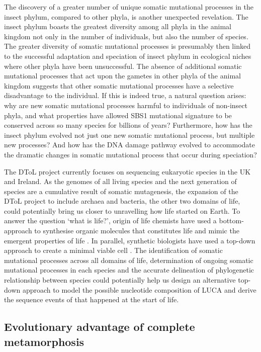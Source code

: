 The discovery of a greater number of unique somatic mutational processes in the insect phylum, compared to other phyla, is another unexpected revelation. The insect phylum boasts the greatest diversity among all phyla in the animal kingdom not only in the number of individuals, but also the number of species. The greater diversity of somatic mutational processes is presumably then linked to the successful adaptation and speciation of insect phylum in ecological niches where other phyla have been unsuccessful. The absence of additional somatic mutational processes that act upon the gametes in other phyla of the animal kingdom suggests that other somatic mutational processes have a selective disadvantage to the individual. If this is indeed true, a natural question arises: why are new somatic mutational processes harmful to individuals of non-insect phyla, and what properties have allowed SBS1 mutational signature to be conserved across so many species for billions of years? Furthermore, how has the insect phylum evolved not just one new somatic mutational process, but multiple new processes? And how has the DNA damage pathway evolved to accommodate the dramatic changes in somatic mutational process that occur during speciation? 

The DToL project currently focuses on sequencing eukaryotic species in the UK and Ireland. As the genomes of all living species and the next generation of species are a cumulative result of somatic mutagenesis, the expansion of the DToL project to include archaea and bacteria, the other two domains of life, could potentially bring us closer to unravelling how life started on Earth. To answer the question ‘what is life?’, origin of life chemists have used a bottom-approach to synthesise organic molecules that constitutes life and mimic the emergent properties of life \cite{Miller1953-gt}. In parallel, synthetic biologists have used a top-down approach to create a minimal viable cell \cite{Hutchison2016-el}. The identification of somatic mutational processes across all domains of life, determination of ongoing somatic mutational processes in each species and the accurate delineation of phylogenetic relationship between species could potentially help us design an alternative top-down approach to model the possible nucleotide composition of LUCA and derive the sequence events of that happened at the start of life. 

\subsection{Evolutionary advantage of complete metamorphosis}

